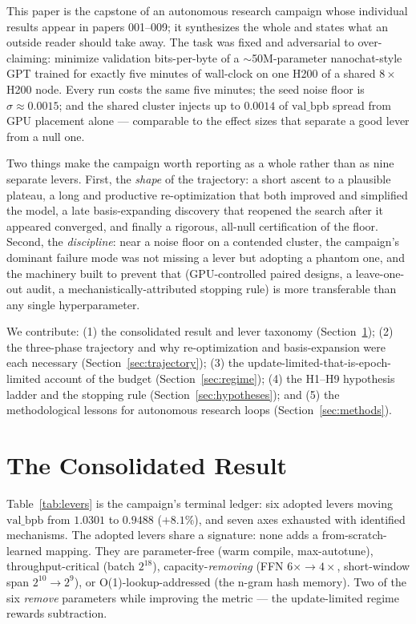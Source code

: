 \documentclass{article}
\newcommand{\valbpb}{\mathrm{val\_bpb}}
\begin{document}
This paper is the capstone of an autonomous research campaign whose individual results appear in papers 001--009; it synthesizes the whole and states what an outside reader should take away. The task was fixed and adversarial to over-claiming: minimize validation bits-per-byte of a $\sim$50M-parameter nanochat-style GPT \cite{karpathy2025nanochat} trained for exactly five minutes of wall-clock on one H200 of a shared $8\times$H200 node. Every run costs the same five minutes; the seed noise floor is $\sigma\approx0.0015$; and the shared cluster injects up to $0.0014$ of $\valbpb$ spread from GPU placement alone --- comparable to the effect sizes that separate a good lever from a null one.

Two things make the campaign worth reporting as a whole rather than as nine separate levers. First, the \emph{shape} of the trajectory: a short ascent to a plausible plateau, a long and productive re-optimization that both improved and simplified the model, a late basis-expanding discovery that reopened the search after it appeared converged, and finally a rigorous, all-null certification of the floor. Second, the \emph{discipline}: near a noise floor on a contended cluster, the campaign's dominant failure mode was not missing a lever but adopting a phantom one, and the machinery built to prevent that (GPU-controlled paired designs, a leave-one-out audit, a mechanistically-attributed stopping rule) is more transferable than any single hyperparameter.

We contribute: (1) the consolidated result and lever taxonomy (Section~\ref{sec:result}); (2) the three-phase trajectory and why re-optimization and basis-expansion were each necessary (Section~\ref{sec:trajectory}); (3) the update-limited-that-is-epoch-limited account of the budget (Section~\ref{sec:regime}); (4) the H1--H9 hypothesis ladder and the stopping rule (Section~\ref{sec:hypotheses}); and (5) the methodological lessons for autonomous research loops (Section~\ref{sec:methods}).

\section{The Consolidated Result}
\label{sec:result}

Table~\ref{tab:levers} is the campaign's terminal ledger: six adopted levers moving $\valbpb$ from $1.0301$ to $0.9488$ ($+8.1\%$), and seven axes exhausted with identified mechanisms. The adopted levers share a signature: none adds a from-scratch-learned mapping. They are parameter-free (warm compile, max-autotune), throughput-critical (batch $2^{18}$), capacity-\emph{removing} (FFN $6\times\to4\times$, short-window span $2^{10}\to2^{9}$), or O(1)-lookup-addressed (the n-gram hash memory). Two of the six \emph{remove} parameters while improving the metric --- the update-limited regime rewards subtraction.
\end{document}
